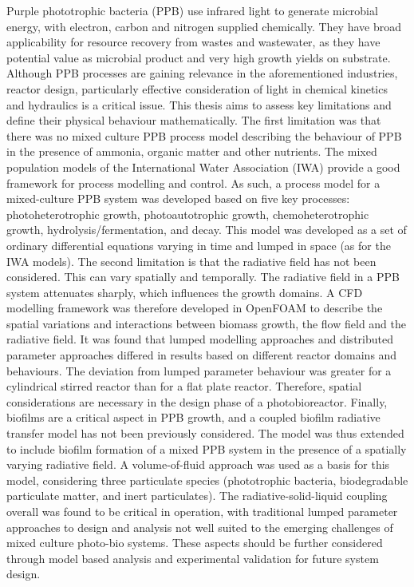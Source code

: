%
%
%
%
%

Purple phototrophic bacteria (PPB) use infrared light to generate microbial energy, with electron, carbon and nitrogen supplied chemically. They have broad applicability for resource recovery from wastes and wastewater, as they have potential value as microbial product and very high growth yields on substrate. Although PPB processes are gaining relevance in the aforementioned industries, reactor design, particularly effective consideration of light in chemical kinetics and hydraulics is a critical issue. This thesis aims to assess key limitations and define their physical behaviour mathematically. The first limitation was that there was no mixed culture PPB process model describing the behaviour of PPB in the presence of ammonia, organic matter and other nutrients. The mixed population models of the International Water Association (IWA) provide a good framework for process modelling and control. As such, a process model for a mixed-culture PPB system was developed based on five key processes: photoheterotrophic growth, photoautotrophic growth, chemoheterotrophic growth, hydrolysis/fermentation, and decay. This model was developed as a set of ordinary differential equations varying in time and lumped in space (as for the IWA models). The second limitation is that the radiative field has not been considered. This can vary spatially and temporally. The radiative field in a PPB system attenuates sharply, which influences the growth domains. A CFD modelling framework was therefore developed in OpenFOAM to describe the spatial variations and interactions between biomass growth, the flow field and the radiative field. It was found that lumped modelling approaches and distributed parameter approaches differed in results based on different reactor domains and behaviours. The deviation from lumped parameter behaviour was greater for a cylindrical stirred reactor than for a flat plate reactor. Therefore, spatial considerations are necessary in the design phase of a photobioreactor. Finally, biofilms are a critical aspect in PPB growth, and a coupled biofilm radiative transfer model has not been previously considered. The model was thus extended to include biofilm formation of a mixed PPB system in the presence of a spatially varying radiative field. A volume-of-fluid approach was used as a basis for this model, considering three particulate species (phototrophic bacteria, biodegradable particulate matter, and inert particulates). The radiative-solid-liquid coupling overall was found to be critical in operation, with traditional lumped parameter approaches to design and analysis not well suited to the emerging challenges of mixed culture photo-bio systems. These aspects should be further considered through model based analysis and experimental validation for future system design.

%